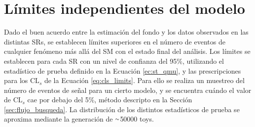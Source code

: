 \begin{table}[ht!]
\begin{tabular}{lccc}
      \hline
      \hline
    \end{tabular}
\label{tab:syst_rel_impact}
\end{table}




\section{Límites independientes del modelo}


Dado el buen acuerdo entre la estimación del fondo y los datos observados en las distintas SRs, se establecen límites superiores en el número de eventos de cualquier fenómeno más allá del SM con el estado final del análisis. Los límites se establecen para cada SR con un nivel de confianza del 95\%, utilizando el estadístico de prueba definido en la Ecuación \ref{ec:st_qmu}, y las prescripciones para los $\text{CL}_{s}$ de la Ecuación \ref{eq:cls_limits}. Para ello se realiza un muestreo del número de eventos de señal para un cierto modelo, y se encuentra cuándo el valor de $\text{CL}_{s}$ cae por debajo del 5\%, método descripto en la Sección \ref{sec:flujo_busqueda}. La distribución de los distintos estadísticos de prueba se aproxima mediante la generación de {$\smallsim$}50000 toys.

